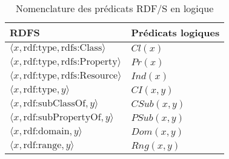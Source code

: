 \begin{table}[ht]
    \centering
    \begin{tabular}{|l|l|}
        \hline
        RDFS                                                       & Prédicats logiques \\
        \hline
        $\langle x, \text{rdf:type}, \text{rdfs:Class} \rangle$    & $Cl(x)$            \\
        $\langle x, \text{rdf:type}, \text{rdfs:Property} \rangle$ & $Pr(x)$            \\
        $\langle x, \text{rdf:type}, \text{rdfs:Resource} \rangle$ & $Ind(x)$           \\
        $\langle x, \text{rdf:type}, y \rangle$                    & $CI(x, y)$         \\
        $\langle x, \text{rdf:subClassOf}, y \rangle$              & $CSub(x, y)$       \\
        $\langle x, \text{rdf:subPropertyOf}, y \rangle$           & $PSub(x, y)$       \\
        $\langle x, \text{rdf:domain}, y \rangle$                  & $Dom(x, y)$        \\
        $\langle x, \text{rdf:range}, y \rangle$                   & $Rng(x, y)$        \\
        \hline
    \end{tabular}
    \caption{Nomenclature des prédicats RDF/S en logique}
    \label{table:update:soa:rdfs}
\end{table}

